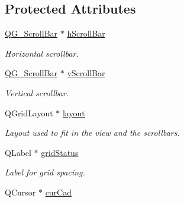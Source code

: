 \subsection*{Protected Attributes}
\begin{DoxyCompactItemize}
\item 
\hypertarget{classQG__GraphicView_ad58d61ef1c8d55ae0016c5da317550c8}{\hyperlink{classQG__ScrollBar}{Q\-G\-\_\-\-Scroll\-Bar} $\ast$ \hyperlink{classQG__GraphicView_ad58d61ef1c8d55ae0016c5da317550c8}{h\-Scroll\-Bar}}\label{classQG__GraphicView_ad58d61ef1c8d55ae0016c5da317550c8}

\begin{DoxyCompactList}\small\item\em Horizontal scrollbar. \end{DoxyCompactList}\item 
\hypertarget{classQG__GraphicView_a97bbc7236986c3666257b0486e0386a0}{\hyperlink{classQG__ScrollBar}{Q\-G\-\_\-\-Scroll\-Bar} $\ast$ \hyperlink{classQG__GraphicView_a97bbc7236986c3666257b0486e0386a0}{v\-Scroll\-Bar}}\label{classQG__GraphicView_a97bbc7236986c3666257b0486e0386a0}

\begin{DoxyCompactList}\small\item\em Vertical scrollbar. \end{DoxyCompactList}\item 
\hypertarget{classQG__GraphicView_a7f86ef7c82675d166d0cc858db64cf0d}{Q\-Grid\-Layout $\ast$ \hyperlink{classQG__GraphicView_a7f86ef7c82675d166d0cc858db64cf0d}{layout}}\label{classQG__GraphicView_a7f86ef7c82675d166d0cc858db64cf0d}

\begin{DoxyCompactList}\small\item\em Layout used to fit in the view and the scrollbars. \end{DoxyCompactList}\item 
\hypertarget{classQG__GraphicView_a3cd7b96e122d1e970a56f4054f67cad9}{Q\-Label $\ast$ \hyperlink{classQG__GraphicView_a3cd7b96e122d1e970a56f4054f67cad9}{grid\-Status}}\label{classQG__GraphicView_a3cd7b96e122d1e970a56f4054f67cad9}

\begin{DoxyCompactList}\small\item\em Label for grid spacing. \end{DoxyCompactList}\item 
\hypertarget{classQG__GraphicView_ab92b2d35350c0bfd413dcbf70aa45786}{Q\-Cursor $\ast$ \hyperlink{classQG__GraphicView_ab92b2d35350c0bfd413dcbf70aa45786}{cur\-Cad}}\label{classQG__GraphicView_ab92b2d35350c0bfd413dcbf70aa45786}


\end{DoxyCompactItemize}
